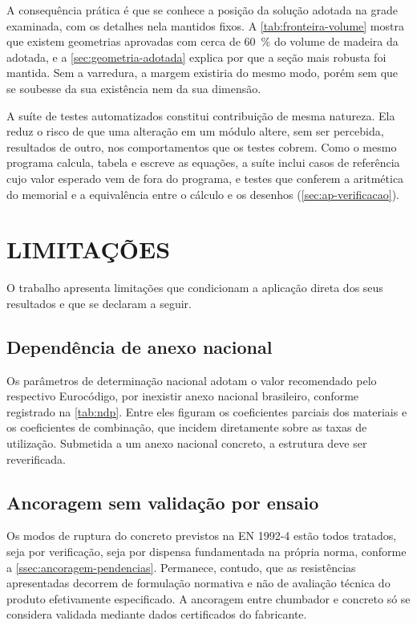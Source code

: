 A consequência prática é que se conhece a posição da solução adotada na grade
examinada, com os detalhes nela mantidos fixos. A
\autoref{tab:fronteira-volume} mostra que existem geometrias aprovadas com
cerca de 60~\% do volume de madeira da adotada, e a
\autoref{sec:geometria-adotada} explica por que a seção mais robusta foi mantida.
Sem a varredura, a margem existiria do mesmo modo, porém sem que se soubesse da
sua existência nem da sua dimensão.

A suíte de \nTestes{} testes automatizados constitui contribuição de mesma natureza.
Ela reduz o risco de que uma alteração em um módulo altere, sem ser percebida,
resultados de outro, nos comportamentos que os testes cobrem. Como o mesmo
programa calcula, tabela e escreve as equações, a suíte inclui casos de
referência cujo valor esperado vem de fora do programa, e testes que conferem a
aritmética do memorial e a equivalência entre o cálculo e os desenhos
(\autoref{sec:ap-verificacao}).

\section{LIMITAÇÕES}\label{sec:limitacoes}

O trabalho apresenta limitações que condicionam a aplicação direta dos seus
resultados e que se declaram a seguir.

\subsection{Dependência de anexo nacional}\label{ssec:lim-ndp}

Os \nNDP{} parâmetros de determinação nacional adotam o valor recomendado pelo
respectivo Eurocódigo, por inexistir anexo nacional brasileiro, conforme
registrado na \autoref{tab:ndp}. Entre eles figuram os coeficientes parciais dos
materiais e os coeficientes de combinação, que incidem diretamente sobre as taxas de
utilização. Submetida a um anexo nacional concreto, a estrutura deve ser
reverificada.

\subsection{Ancoragem sem validação por ensaio}\label{ssec:lim-ancoragem}

Os modos de ruptura do concreto previstos na EN 1992-4 \cite{EN1992-4:2018}
estão todos tratados, seja por verificação, seja por dispensa fundamentada na
própria norma, conforme a \autoref{ssec:ancoragem-pendencias}. Permanece,
contudo, que as resistências apresentadas decorrem de formulação normativa e não
de avaliação técnica do produto efetivamente especificado. A ancoragem entre
chumbador e concreto só se considera validada mediante dados certificados do
fabricante.

